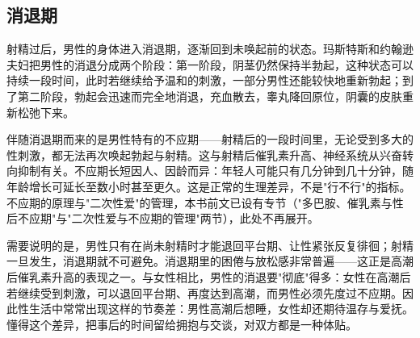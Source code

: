 \subsection{消退期}

射精过后，男性的身体进入消退期，逐渐回到未唤起前的状态。玛斯特斯和约翰逊夫妇把男性的消退分成两个阶段：第一阶段，阴茎仍然保持半勃起，这种状态可以持续一段时间，此时若继续给予温和的刺激，一部分男性还能较快地重新勃起；到了第二阶段，勃起会迅速而完全地消退，充血散去，睾丸降回原位，阴囊的皮肤重新松弛下来。

伴随消退期而来的是男性特有的不应期——射精后的一段时间里，无论受到多大的性刺激，都无法再次唤起勃起与射精。这与射精后催乳素升高、神经系统从兴奋转向抑制有关。不应期长短因人、因龄而异：年轻人可能只有几分钟到几十分钟，随年龄增长可延长至数小时甚至更久。这是正常的生理差异，不是"行不行"的指标。不应期的原理与"二次性爱"的管理，本书前文已设有专节（"多巴胺、催乳素与性后不应期"与"二次性爱与不应期的管理"两节），此处不再展开。

需要说明的是，男性只有在尚未射精时才能退回平台期、让性紧张反复徘徊；射精一旦发生，消退期就不可避免。消退期里的困倦与放松感非常普遍——这正是高潮后催乳素升高的表现之一。与女性相比，男性的消退要"彻底"得多：女性在高潮后若继续受到刺激，可以退回平台期、再度达到高潮，而男性必须先度过不应期。因此性生活中常常出现这样的节奏差：男性高潮后想睡，女性却还期待温存与爱抚。懂得这个差异，把事后的时间留给拥抱与交谈，对双方都是一种体贴。
